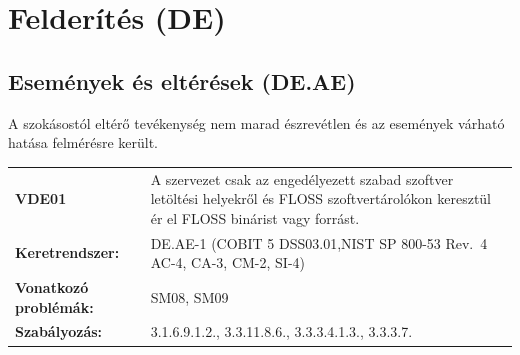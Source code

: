\documentclass[12pt,magyar,a4paper,oneside]{scrreprt}
\begin{document}
\hypertarget{felderuxedtuxe9s-de}{%
\section{Felderítés (DE)}\label{felderuxedtuxe9s-de}}

\hypertarget{esemuxe9nyek-uxe9s-eltuxe9ruxe9sek-de.ae}{%
\subsection{Események és eltérések
(DE.AE)}\label{esemuxe9nyek-uxe9s-eltuxe9ruxe9sek-de.ae}}

A szokásostól eltérő tevékenység nem marad észrevétlen és az események
várható hatása felmérésre került.

\begin{longtable}[]{@{}ll@{}}
\toprule
\endhead
\begin{minipage}[t]{0.16\columnwidth}\raggedright
\textbf{VDE01}\strut
\end{minipage} & \begin{minipage}[t]{0.79\columnwidth}\raggedright
A szervezet csak az engedélyezett szabad szoftver letöltési helyekről és
FLOSS szoftvertárolókon keresztül ér el FLOSS binárist vagy
forrást.\strut
\end{minipage}\tabularnewline
\begin{minipage}[t]{0.16\columnwidth}\raggedright
\textbf{Keretrendszer:}\strut
\end{minipage} & \begin{minipage}[t]{0.79\columnwidth}\raggedright
DE.AE-1 (COBIT 5 DSS03.01,NIST SP 800-53 Rev.~4 AC-4, CA-3, CM-2,
SI-4)\strut
\end{minipage}\tabularnewline
\begin{minipage}[t]{0.16\columnwidth}\raggedright
\textbf{Vonatkozó problémák:}\strut
\end{minipage} & \begin{minipage}[t]{0.79\columnwidth}\raggedright
SM08, SM09\strut
\end{minipage}\tabularnewline
\begin{minipage}[t]{0.16\columnwidth}\raggedright
\textbf{Szabályozás:}\strut
\end{minipage} & \begin{minipage}[t]{0.79\columnwidth}\raggedright
3.1.6.9.1.2., 3.3.11.8.6., 3.3.3.4.1.3., 3.3.3.7.\strut
\end{minipage}\tabularnewline
\bottomrule
\end{longtable}
\end{document}
